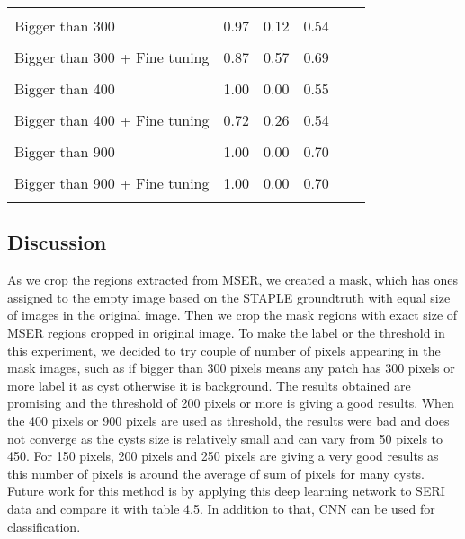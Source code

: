 \begin{table*}
{\begin{tabular}{l ccccc}
  \multicolumn{6}{c}{}\\[-1.5ex]
  Bigger than 300 & 0.97 & 0.12 & 0.54  \\
  \multicolumn{6}{c}{}\\[-1.5ex]
  Bigger than 300 + Fine tuning & 0.87 & 0.57 & 0.69 \\
  \multicolumn{6}{c}{}\\[-1.5ex]
  Bigger than 400 & 1.00 & 0.00 & 0.55  \\
  \multicolumn{6}{c}{}\\[-1.5ex]
  Bigger than 400 + Fine tuning & 0.72 & 0.26 & 0.54 \\
  \multicolumn{6}{c}{}\\[-1.5ex]
  Bigger than 900 & 1.00 & 0.00 & 0.70  \\
  \multicolumn{6}{c}{}\\[-1.5ex]
  Bigger than 900 + Fine tuning & 1.00 & 0.00 & 0.70 \\
  \multicolumn{6}{c}{}\\[-1.5ex]
\bottomrule
\end{tabular}}
\end{table*}
\subsection{Discussion}
As we crop the regions extracted from MSER, we created a mask, which has ones assigned to the empty image based on the STAPLE groundtruth with equal size of images in the original image.
Then we crop the mask regions with exact size of MSER regions cropped in original image.
To make the label or the threshold in this experiment, we decided to try couple of number of pixels appearing in the mask images, such as if bigger than 300 pixels means any patch has 300 pixels or more label it as cyst otherwise it is background.
The results obtained are promising and the threshold of 200 pixels or more is giving a good results.
When the 400 pixels or 900 pixels are used as threshold, the results were bad and does not converge as the cysts size is relatively small and can vary from 50 pixels to 450.
For 150 pixels, 200 pixels and 250 pixels are giving a very good results as this number of pixels is around the average of sum of pixels for many cysts.
Future work for this method is by applying this deep learning network to SERI data and compare it with table 4.5.
In addition to that, CNN can be used for classification.
